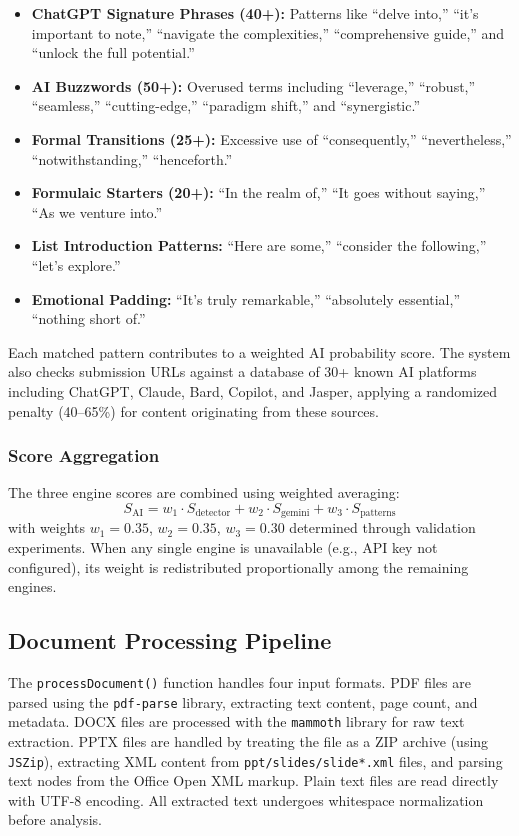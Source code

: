 \documentclass[10pt,twocolumn]{article}
\begin{document}
\begin{itemize}
\item \textbf{ChatGPT Signature Phrases (40+):} Patterns like ``delve into,'' ``it's important to note,'' ``navigate the complexities,'' ``comprehensive guide,'' and ``unlock the full potential.''
\item \textbf{AI Buzzwords (50+):} Overused terms including ``leverage,'' ``robust,'' ``seamless,'' ``cutting-edge,'' ``paradigm shift,'' and ``synergistic.''
\item \textbf{Formal Transitions (25+):} Excessive use of ``consequently,'' ``nevertheless,'' ``notwithstanding,'' ``henceforth.''
\item \textbf{Formulaic Starters (20+):} ``In the realm of,'' ``It goes without saying,'' ``As we venture into.''
\item \textbf{List Introduction Patterns:} ``Here are some,'' ``consider the following,'' ``let's explore.''
\item \textbf{Emotional Padding:} ``It's truly remarkable,'' ``absolutely essential,'' ``nothing short of.''
\end{itemize}

Each matched pattern contributes to a weighted AI probability score. The system also checks submission URLs against a database of 30+ known AI platforms including ChatGPT, Claude, Bard, Copilot, and Jasper, applying a randomized penalty (40--65\%) for content originating from these sources.

\subsubsection{Score Aggregation}
The three engine scores are combined using weighted averaging:
\begin{equation}
S_{\text{AI}} = w_1 \cdot S_{\text{detector}} + w_2 \cdot S_{\text{gemini}} + w_3 \cdot S_{\text{patterns}}
\end{equation}
with weights $w_1 = 0.35$, $w_2 = 0.35$, $w_3 = 0.30$ determined through validation experiments. When any single engine is unavailable (e.g., API key not configured), its weight is redistributed proportionally among the remaining engines.

\subsection{Document Processing Pipeline}

The \texttt{processDocument()} function handles four input formats. PDF files are parsed using the \texttt{pdf-parse} library, extracting text content, page count, and metadata. DOCX files are processed with the \texttt{mammoth} library for raw text extraction. PPTX files are handled by treating the file as a ZIP archive (using \texttt{JSZip}), extracting XML content from \texttt{ppt/slides/slide*.xml} files, and parsing text nodes from the Office Open XML markup. Plain text files are read directly with UTF-8 encoding. All extracted text undergoes whitespace normalization before analysis.
\end{document}
